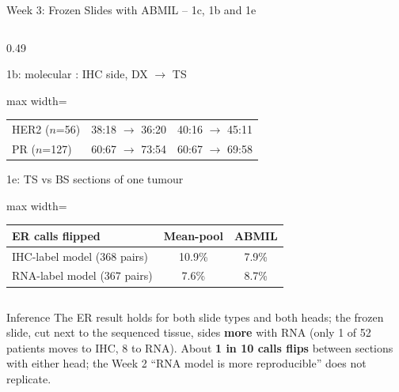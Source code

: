\documentclass[aspectratio=169,10pt]{beamer}
\begin{document}
\begin{frame}[t]{Week 3: Frozen Slides with ABMIL -- 1c, 1b and 1e}
\begin{columns}[T]
\begin{column}{0.49\textwidth}
\begin{block}{1b: molecular : IHC side, DX $\rightarrow$ TS}
\begin{adjustbox}{max width=\linewidth}
\begin{tabular}{lcc}
HER2 ($n$=56) & 38:18 $\rightarrow$ 36:20 & 40:16 $\rightarrow$ 45:11 \\
PR ($n$=127) & 60:67 $\rightarrow$ 73:54 & 60:67 $\rightarrow$ 69:58 \\
\bottomrule
\end{tabular}
\end{adjustbox}
\end{block}
\begin{block}{1e: TS vs BS sections of one tumour}
\centering
\scriptsize
\begin{adjustbox}{max width=\linewidth}
\begin{tabular}{lcc}
\toprule
ER calls flipped & Mean-pool & ABMIL \\
\midrule
IHC-label model (368 pairs) & 10.9\% & 7.9\% \\
RNA-label model (367 pairs) & 7.6\% & 8.7\% \\
\bottomrule
\end{tabular}
\end{adjustbox}
\end{block}
\end{column}
\end{columns}

\vspace{2pt}
\begin{alertblock}{Inference}
The ER result holds for both slide types and both heads; the frozen slide, cut next to the sequenced tissue, sides
\textbf{more} with RNA (only 1 of 52 patients moves to IHC, 8 to RNA). About \textbf{1 in 10 calls flips} between
sections with either head; the Week 2 ``RNA model is more reproducible'' does not replicate.
\end{alertblock}
\end{frame}
\end{document}
